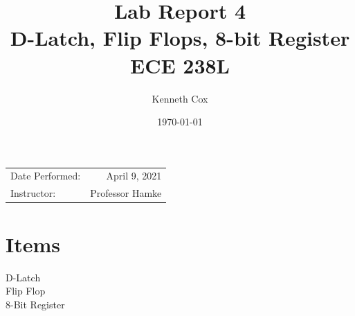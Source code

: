 \documentclass{article}
\title{Lab Report 4 \\ D-Latch, Flip Flops, 8-bit Register \\ ECE 238L \\} %
\author{Kenneth Cox}
\date{\today} %
\begin{document}
\maketitle %

\begin{center}
\begin{tabular}{l r}
Date Performed: & April 9, 2021 \\ %
Instructor: & Professor Hamke %
\end{tabular}
\end{center}






\section{Items}

\begin{description}
\item[D-Latch]
\item[Flip Flop]
\item[8-Bit Register]
\end{description} 
 
\end{document}
